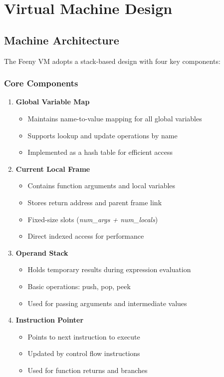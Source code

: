 \documentclass[12pt, a4paper]{article}
\begin{document}
\section{Virtual Machine Design}

\subsection{Machine Architecture}
The Feeny VM adopts a stack-based design with four key components:

\subsubsection{Core Components}
\begin{enumerate}
\item \textbf{Global Variable Map}
    \begin{itemize}
    \item Maintains name-to-value mapping for all global variables
    \item Supports lookup and update operations by name
    \item Implemented as a hash table for efficient access
    \end{itemize}

\item \textbf{Current Local Frame}
    \begin{itemize}
    \item Contains function arguments and local variables
    \item Stores return address and parent frame link
    \item Fixed-size slots (\textit{num\_args + num\_locals})
    \item Direct indexed access for performance
    \end{itemize}

\item \textbf{Operand Stack}
    \begin{itemize}
    \item Holds temporary results during expression evaluation
    \item Basic operations: push, pop, peek
    \item Used for passing arguments and intermediate values
    \end{itemize}

\item \textbf{Instruction Pointer}
    \begin{itemize}
    \item Points to next instruction to execute
    \item Updated by control flow instructions
    \item Used for function returns and branches
    \end{itemize}
\end{enumerate}
\end{document}
